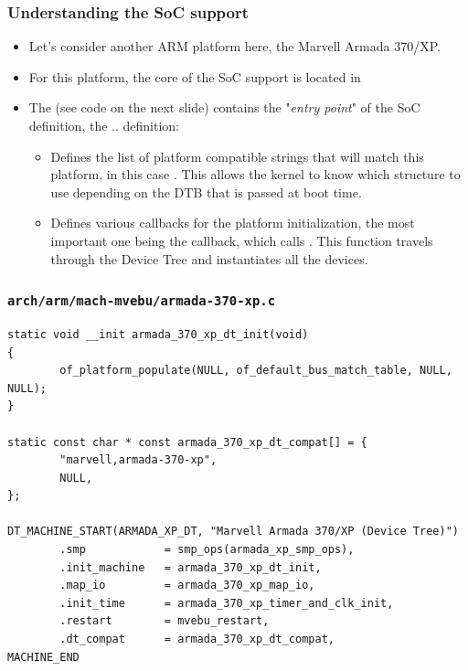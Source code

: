 \begin{frame}
  \frametitle{Understanding the SoC support}
  \begin{itemize}
  \item Let's consider another ARM platform here, the Marvell Armada
    370/XP.
  \item For this platform, the core of the SoC support is located in
  \item The  (see code on the next slide)
    contains the "{\em entry point}" of the SoC definition, the
     ..  definition:
    \begin{itemize}
    \item Defines the list of platform compatible strings that will
      match this platform, in this case
      . This allows the kernel to know
      which  structure to use depending on the DTB
      that is passed at boot time.
    \item Defines various callbacks for the platform initialization,
      the most important one being the  callback,
      which calls . This function travels
      through the Device Tree and instantiates all the devices.
    \end{itemize}
  \end{itemize}
\end{frame}

\begin{frame}[fragile]
  \frametitle{{\tt arch/arm/mach-mvebu/armada-370-xp.c}}
  \begin{block}{}
    \begin{verbatim}
static void __init armada_370_xp_dt_init(void)
{
        of_platform_populate(NULL, of_default_bus_match_table, NULL, NULL);
}

static const char * const armada_370_xp_dt_compat[] = {
        "marvell,armada-370-xp",
        NULL,
};

DT_MACHINE_START(ARMADA_XP_DT, "Marvell Armada 370/XP (Device Tree)")
        .smp            = smp_ops(armada_xp_smp_ops),
        .init_machine   = armada_370_xp_dt_init,
        .map_io         = armada_370_xp_map_io,
        .init_time      = armada_370_xp_timer_and_clk_init,
        .restart        = mvebu_restart,
        .dt_compat      = armada_370_xp_dt_compat,
MACHINE_END
  \end{verbatim}
 \end{block}
\end{frame}

